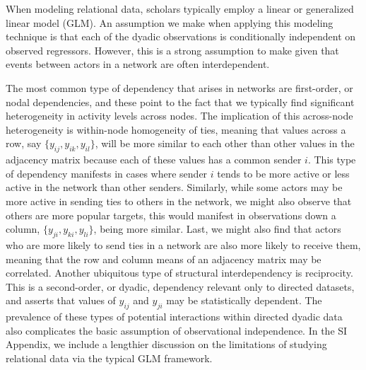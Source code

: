 \documentclass[12pt,twocolumn,twoside]{pnas-new}
\begin{document}
When modeling relational data, scholars typically employ a linear or generalized linear model (GLM). An assumption we make when applying this modeling technique is that each of the dyadic observations is conditionally independent on observed regressors. However, this is a strong assumption to make given that events between actors in a network are often interdependent. 

The most common type of dependency that arises in networks are first-order, or nodal dependencies, and these point to the fact that we typically find significant heterogeneity in activity levels across nodes. The implication of this across-node heterogeneity is within-node homogeneity of ties, meaning that values across a row, say $\{y_{ij},y_{ik},y_{il}\}$, will be more similar to each other than other values in the adjacency matrix because each of these values has a common sender $i$. This type of dependency manifests in cases where sender $i$ tends to be more active or less active in the network than other senders. Similarly, while some actors may be more active in sending ties to others in the network, we might also observe that others are more popular targets, this would manifest in observations down a column, $\{y_{ji},y_{ki},y_{li}\}$, being more similar. Last, we might also find that actors who are more likely to send ties in a network are also more likely to receive them, meaning that the row and column means of an adjacency matrix may be correlated. Another ubiquitous type of structural interdependency is reciprocity. This is a second-order, or dyadic, dependency relevant only to directed datasets, and asserts that values of $y_{ij}$ and $y_{ji}$ may be statistically dependent. The prevalence of these types of potential interactions within directed dyadic data also complicates the basic assumption of observational independence. In the SI Appendix, we include a lengthier discussion on the limitations of studying relational data via the typical GLM framework.
\end{document}
